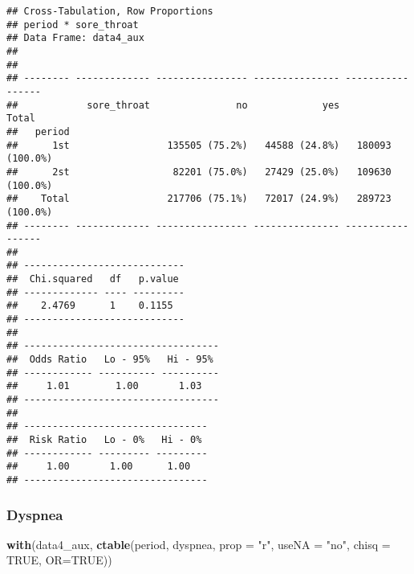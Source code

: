 \documentclass[
]{article}
\newenvironment{Shaded}{\begin{snugshade}}{\end{snugshade}}
\newcommand{\DataTypeTok}[1]{\textcolor[rgb]{0.13,0.29,0.53}{#1}}
\newcommand{\KeywordTok}[1]{\textcolor[rgb]{0.13,0.29,0.53}{\textbf{#1}}}
\newcommand{\NormalTok}[1]{#1}
\newcommand{\OtherTok}[1]{\textcolor[rgb]{0.56,0.35,0.01}{#1}}
\newcommand{\StringTok}[1]{\textcolor[rgb]{0.31,0.60,0.02}{#1}}
\begin{document}
\begin{verbatim}
## Cross-Tabulation, Row Proportions  
## period * sore_throat  
## Data Frame: data4_aux  
## 
## 
## -------- ------------- ---------------- --------------- -----------------
##            sore_throat               no             yes             Total
##   period                                                                 
##      1st                 135505 (75.2%)   44588 (24.8%)   180093 (100.0%)
##      2st                  82201 (75.0%)   27429 (25.0%)   109630 (100.0%)
##    Total                 217706 (75.1%)   72017 (24.9%)   289723 (100.0%)
## -------- ------------- ---------------- --------------- -----------------
## 
## ----------------------------
##  Chi.squared   df   p.value 
## ------------- ---- ---------
##    2.4769      1    0.1155  
## ----------------------------
## 
## ----------------------------------
##  Odds Ratio   Lo - 95%   Hi - 95% 
## ------------ ---------- ----------
##     1.01        1.00       1.03   
## ----------------------------------
## 
## --------------------------------
##  Risk Ratio   Lo - 0%   Hi - 0% 
## ------------ --------- ---------
##     1.00       1.00      1.00   
## --------------------------------
\end{verbatim}

\hypertarget{dyspnea}{%
\subsubsection{Dyspnea}\label{dyspnea}}

\begin{Shaded}
\begin{Highlighting}[]
\KeywordTok{with}\NormalTok{(data4_aux, }\KeywordTok{ctable}\NormalTok{(period, dyspnea, }\DataTypeTok{prop =} \StringTok{"r"}\NormalTok{, }\DataTypeTok{useNA =} \StringTok{"no"}\NormalTok{, }\DataTypeTok{chisq =} \OtherTok{TRUE}\NormalTok{, }\DataTypeTok{OR=}\OtherTok{TRUE}\NormalTok{))}
\end{Highlighting}
\end{Shaded}
\end{document}

